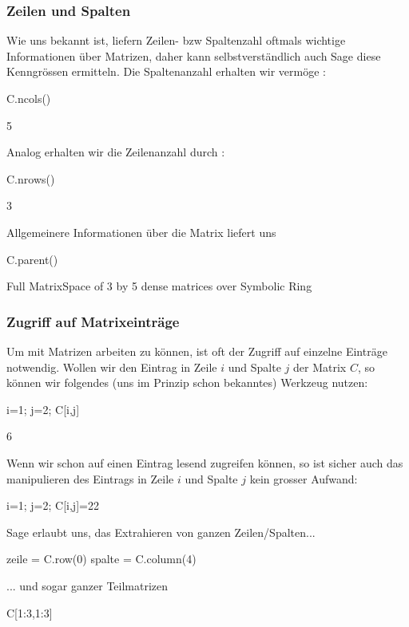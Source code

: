 \documentclass[fontsize=12pt,paper=a4,twoside,bibtotoc,idxtotoc,
liststotoc,pagesize,BCOR1.2cm,DIV15,chapterprefix,pagesize=pdftex]{scrbook}
\theoremstyle{plain}
\theoremstyle{definition}
\theoremstyle{remark}
\begin{document}
\subsubsection{Zeilen und Spalten}
Wie uns bekannt ist, liefern Zeilen- bzw Spaltenzahl oftmals wichtige Informationen über Matrizen, daher kann selbstverständlich auch Sage diese Kenngrössen ermitteln. 
Die Spaltenanzahl erhalten wir vermöge :
\begin{sagein}
C.ncols()
\end{sagein}
\begin{sageout}
  5
\end{sageout}
Analog erhalten wir die Zeilenanzahl durch :
\begin{sagein}
C.nrows()
\end{sagein}
\begin{sageout}
  3
\end{sageout}
Allgemeinere Informationen über die Matrix liefert uns 
\begin{sagein}
C.parent()
\end{sagein}
\begin{sageout}
Full MatrixSpace of 3 by 5 dense matrices over Symbolic Ring
\end{sageout}
\subsubsection{Zugriff auf Matrixeinträge}
Um mit Matrizen arbeiten zu können, ist oft der Zugriff auf einzelne Einträge notwendig. Wollen wir den Eintrag in Zeile $i$ und Spalte $j$ der Matrix $C$, so können wir folgendes 
(uns im Prinzip schon bekanntes) Werkzeug nutzen:
\begin{sagein}
i=1; j=2; C[i,j]
\end{sagein}
\begin{sageout}
  6
\end{sageout}
Wenn wir schon auf einen Eintrag lesend zugreifen können, so ist sicher auch das manipulieren des Eintrags in Zeile $i$ und Spalte $j$ kein grosser Aufwand:
\begin{sagein}
i=1; j=2; C[i,j]=22
\end{sagein}
Sage erlaubt uns, das Extrahieren von ganzen Zeilen/Spalten...
\begin{sagein}
zeile = C.row(0)
spalte = C.column(4)
\end{sagein}
... und sogar ganzer Teilmatrizen
\begin{sagein}
C[1:3,1:3]
\end{sagein}
\end{document}
